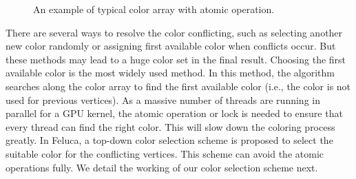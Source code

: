 \begin{figure}[h]
\centering
{}%
%
\caption{An example of typical color array with atomic operation.}
\label{fig:atomic}%
\end{figure}
 
There are several ways to resolve the color conflicting, such as selecting another new color randomly or assigning first available color when conflicts occur.  
But these methods may lead to a huge color set in the final result. Choosing the first available color is the most widely used method. In this method, 
the algorithm searches along the color array to find the first available color (i.e., the color is 
not used for previous vertices). As a massive number of threads are running in parallel for 
a GPU kernel, the atomic operation or lock is needed to ensure that every thread can 
find the right color. This will slow down the coloring process greatly. In Feluca, 
a top-down color selection scheme is 
proposed to select the suitable color for the conflicting vertices. This scheme can avoid the atomic operations fully. We detail the working of our color selection scheme next. 

